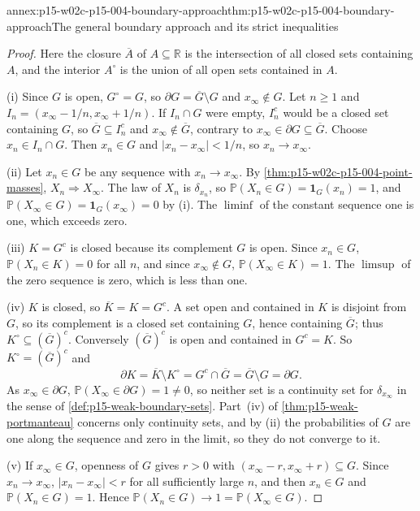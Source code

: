 \begin{annexitem}{annex:p15-w02c-p15-004-boundary-approach}{thm:p15-w02c-p15-004-boundary-approach}{The general boundary approach and its strict inequalities}
\begin{proof}
Here the closure \(\overline A\) of \(A\subseteq\mathbb R\) is the
intersection of all closed sets containing \(A\), and the interior
\(A^\circ\) is the union of all open sets contained in \(A\).

(i) Since \(G\) is open, \(G^\circ=G\), so
\(\partial G=\overline G\setminus G\) and \(x_\infty\notin G\). Let
\(n\geq1\) and \(I_n=(x_\infty-1/n,x_\infty+1/n)\). If \(I_n\cap G\)
were empty, \(I_n^c\) would be a closed set containing \(G\), so
\(\overline G\subseteq I_n^c\) and \(x_\infty\notin\overline G\),
contrary to \(x_\infty\in\partial G\subseteq\overline G\). Choose
\(x_n\in I_n\cap G\). Then \(x_n\in G\) and
\(|x_n-x_\infty|<1/n\), so \(x_n\to x_\infty\).

(ii) Let \(x_n\in G\) be any sequence with \(x_n\to x_\infty\). By
\cref{thm:p15-w02c-p15-004-point-masses}, \(X_n\Rightarrow X_\infty\).
The law of \(X_n\) is \(\delta_{x_n}\), so
\(\mathbb P(X_n\in G)=\mathbf1_G(x_n)=1\), and
\(\mathbb P(X_\infty\in G)=\mathbf1_G(x_\infty)=0\) by (i). The
\(\liminf\) of the constant sequence one is one, which exceeds zero.

(iii) \(K=G^c\) is closed because its complement \(G\) is open.
Since \(x_n\in G\), \(\mathbb P(X_n\in K)=0\) for all \(n\), and since
\(x_\infty\notin G\), \(\mathbb P(X_\infty\in K)=1\). The
\(\limsup\) of the zero sequence is zero, which is less than one.

(iv) \(K\) is closed, so \(\overline K=K=G^c\). A set open and
contained in \(K\) is disjoint from \(G\), so its complement is a
closed set containing \(G\), hence containing \(\overline G\); thus
\(K^\circ\subseteq(\overline G)^c\). Conversely \((\overline G)^c\) is
open and contained in \(G^c=K\). So \(K^\circ=(\overline G)^c\) and
\[
 \partial K=\overline K\setminus K^\circ
          =G^c\cap\overline G=\overline G\setminus G=\partial G.
\]
As \(x_\infty\in\partial G\), \(\mathbb P(X_\infty\in\partial G)=1\neq0\),
so neither set is a continuity set for \(\delta_{x_\infty}\) in the
sense of \cref{def:p15-weak-boundary-sets}. Part~(iv) of
\cref{thm:p15-weak-portmanteau} concerns only continuity sets, and by
(ii) the probabilities of \(G\) are one along the sequence and zero in
the limit, so they do not converge to it.

(v) If \(x_\infty\in G\), openness of \(G\) gives \(r>0\) with
\((x_\infty-r,x_\infty+r)\subseteq G\). Since \(x_n\to x_\infty\),
\(|x_n-x_\infty|<r\) for all sufficiently large \(n\), and then
\(x_n\in G\) and \(\mathbb P(X_n\in G)=1\). Hence
\(\mathbb P(X_n\in G)\to1=\mathbb P(X_\infty\in G)\).
\end{proof}
\end{annexitem}


